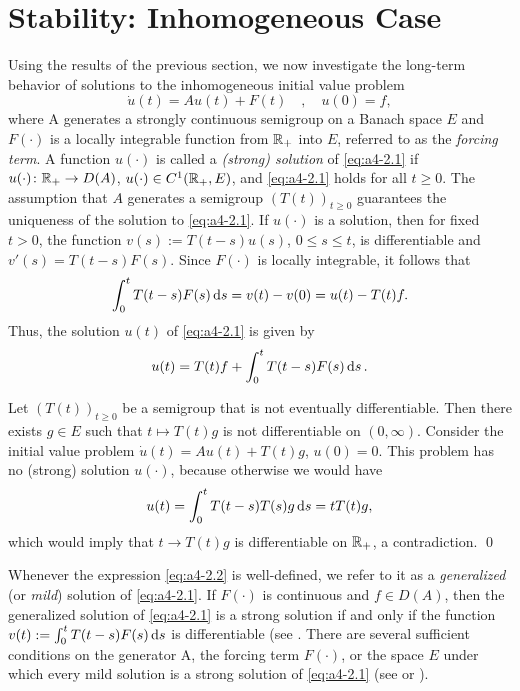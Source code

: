 \section{Stability: Inhomogeneous Case}
Using the results of the previous section, we now investigate the long-term behavior of solutions to the inhomogeneous initial value
problem
\begin{equation}\label{eq:a4-2.1}
\dot{u}(t) = Au(t) + F(t) \quad , \quad u(0) = f,
\end{equation}
where A generates a strongly continuous semigroup on a
Banach space $ E $ and $F(\cdot)$ is a locally integrable function from $\mathbb{R}_{+}$
into $ E $, referred to as the \emph{forcing term}. 
A function $u(\cdot)$ is called a \emph{(strong) solution} of \eqref{eq:a4-2.1} if $u(\cdot) \colon \mathbb{R}_{+} \to D(A)$, 
$u(\cdot) \in C^{1}(\mathbb{R}_{+},E)$, and \eqref{eq:a4-2.1} holds for all $t \geq 0$.
The assumption that $A$ generates a semigroup $(T(t))_{t \geq 0}$
guarantees the uniqueness of the solution to \eqref{eq:a4-2.1}. 
If $u(\cdot)$ is a solution, then for fixed $t>0$, the function $v(s) := T(t-s)u(s)$, $0 \leq s \leq t$, is
differentiable and $v'(s) = T(t-s)F(s)$. 
Since $F(\cdot)$ is locally integrable, it follows that 
\[
\int_{0}^{t} T(t-s)F(s)  \mathop{}\!\mathrm{d}{s} = v(t) - v(0) = u(t) - T(t)f.
\]
Thus, the solution $u(t)$ of \eqref{eq:a4-2.1} is given by
\begin{equation}\label{eq:a4-2.2}
u(t) = T(t)f + \int_{0}^{t} T(t-s)F(s)  \mathop{}\!\mathrm{d}{s}\,.
\end{equation}


\begin{example*} \label{ex:a4-2.1}
Let $(T(t))_{t \geq 0}$ be a semigroup that is not eventually differentiable. 
Then there
exists $g \in E$ such that $t \mapsto T(t)g$ is not differentiable on $(0,\infty)$.
Consider the initial value problem $\dot{u}(t) = Au(t) + T(t)g$, $u(0) = 0$. This problem has no
(strong) solution $u(\cdot)$, because otherwise we would have 
\begin{align*}
u(t) = \int_{0}^{t} T(t-s)T(s)g  \mathop{}\!\mathrm{d}{s} = tT(t)g,
\end{align*}
which would imply that $t\to T(t)g$ is 
differentiable on $\mathbb{R}_{+}$, a contradiction. 
\qed
\end{example*}


Whenever the expression \eqref{eq:a4-2.2} is well-defined, we refer to it as a  \emph{generalized} (or
\emph{mild}) solution of \eqref{eq:a4-2.1}. 
If $F(\cdot)$ is continuous and $f \in D(A)$, then
the generalized solution of \eqref{eq:a4-2.1} is a strong solution if and only if the function 
$v(t) := \int_{0}^{t} T(t-s)F(s)  \mathop{}\!\mathrm{d}{s}$ is differentiable (see \citet[Chapter~4,2.4]{pazy:1983}. 
There are several sufficient conditions on the generator A,
the forcing term $F(\cdot)$, or the space $E$ under which every mild solution
is a strong solution of \eqref{eq:a4-2.1} (see \citet{travis:1981}
or  \citet[Section~4.2]{pazy:1983}).

